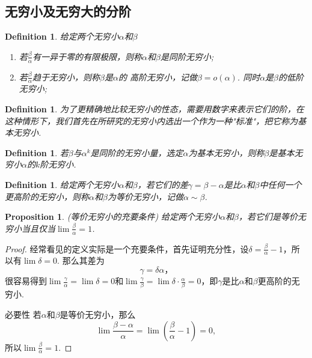 \documentclass{article}
\newtheorem{proposition}[theorem]{Proposition}
\newtheorem{definition}[theorem]{Definition}
\begin{document}
\subsection{无穷小及无穷大的分阶}


\begin{definition}
\rm 给定两个无穷小$\alpha$和$\beta$
\begin{enumerate}
	\item 若$\frac{\beta}{\alpha}$有一异于零的有限极限，则称$\alpha$和$\beta$是{\color{red}同阶无穷小};
	\item 若$\frac{\beta}{\alpha}$趋于无穷小，则称$\beta$是$\alpha$的{\color{red} 高阶无穷小}，记做$\beta = o(\alpha)$.
	同时$\alpha$是$\beta$的低阶无穷小;
\end{enumerate}
\end{definition}

\begin{definition}
\rm 为了更精确地比较无穷小的性态，需要用数字来表示它们的阶，在这种情形下，我们首先在所研究的无穷小内选出一个作为一种"标准"，把它称为{\color{red}基本无穷小}.
\end{definition}

\begin{definition}
\rm 若$\beta$与$\alpha^k$是同阶的无穷小量，选定$\alpha$为基本无穷小，则称$\beta$是基本无穷小$\alpha$的$k$阶无穷小.
\end{definition}

\begin{definition}
\rm 给定两个无穷小$\alpha$和$\beta$，若它们的差$\gamma = \beta - \alpha$是比$\alpha$和$\beta$中任何一个更高阶的无穷小，则称$\alpha$和$\beta$为{\color{red}等价无穷小}，记做$\alpha \sim \beta$.
\end{definition}

\begin{proposition}
\rm {\color{red} (等价无穷小的充要条件)} 给定两个无穷小$\alpha$和$\beta$，若它们是等价无穷小当且仅当$\lim \frac{\beta}{\alpha} = 1$.
\end{proposition}

\begin{proof}
经常看见的定义实际是一个充要条件，首先证明{\color{blue}充分性}，设$\delta = \frac{\beta}{\alpha} - 1$，所以有$\lim \delta = 0$. 那么其差为
$$
\gamma = \delta \alpha，
$$
很容易得到$\lim \frac{\gamma}{\alpha} =\lim \delta = 0$和$\lim \frac{\gamma}{\beta} = \lim \delta\cdot\frac{\alpha}{\beta} = 0$，即$\gamma$是比$\alpha$和$\beta$更高阶的无穷小.

{\color{blue}必要性} 若$\alpha$和$\beta$是等价无穷小，那么
$$
\lim \frac{\beta-\alpha}{\alpha} = \lim (\frac{\beta}{\alpha} - 1) = 0,
$$
所以$\lim \frac{\beta}{\alpha} = 1$.
\end{proof}
\end{document}
